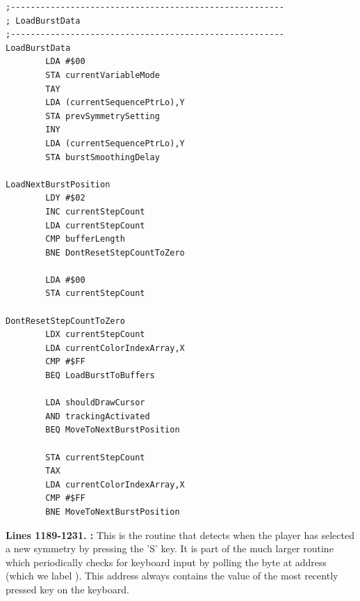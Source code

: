 \clearpage
\begin{lstlisting}
;-------------------------------------------------------
; LoadBurstData
;-------------------------------------------------------
LoadBurstData    
        LDA #$00
        STA currentVariableMode
        TAY 
        LDA (currentSequencePtrLo),Y
        STA prevSymmetrySetting
        INY 
        LDA (currentSequencePtrLo),Y
        STA burstSmoothingDelay

LoadNextBurstPosition    
        LDY #$02
        INC currentStepCount
        LDA currentStepCount
        CMP bufferLength
        BNE DontResetStepCountToZero

        LDA #$00
        STA currentStepCount

DontResetStepCountToZero
        LDX currentStepCount
        LDA currentColorIndexArray,X
        CMP #$FF
        BEQ LoadBurstToBuffers

        LDA shouldDrawCursor
        AND trackingActivated
        BEQ MoveToNextBurstPosition

        STA currentStepCount
        TAX 
        LDA currentColorIndexArray,X
        CMP #$FF
        BNE MoveToNextBurstPosition

\end{lstlisting}
\clearpage

\textbf{Lines 1189-1231. :} This is the routine that detects when the player has selected a new
symmetry by pressing the 'S' key. It is part of the much larger routine  which periodically checks
for keyboard input by polling the byte at address  (which we label ). This address always
contains the value of the most recently pressed key on the keyboard.


